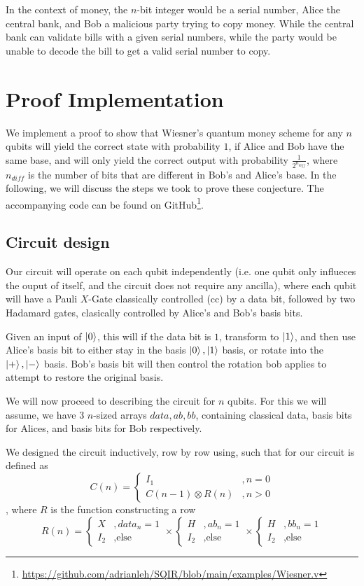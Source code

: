\documentclass{article}
\begin{document}
In the context of money, the $n$-bit integer would be a serial number, Alice the central bank, and Bob a malicious  party trying to copy money.
While the central bank can validate bills with a given serial numbers, while the  party would be unable to decode the bill to get a valid serial number to copy.

\section{Proof Implementation}\label{sec:proof-impl}
We implement a proof to show that Wiesner's quantum money scheme for any $n$ qubits will yield the correct state with probability $1$, if Alice and Bob have the same base, and will only yield the correct output with probability $\frac{1}{2^{n_{diff}}}$, where $n_{diff}$ is the number of bits that are different in Bob's and Alice's base. In the following, we will discuss the steps we took to prove these conjecture. The accompanying code can be found on GitHub\footnote{\url{https://github.com/adrianleh/SQIR/blob/main/examples/Wiesner.v}}.

\subsection{Circuit design}

Our circuit will operate on each qubit independently (i.e. one qubit only influeces the ouput of itself, and the circuit does not require any ancilla), where each qubit will have a Pauli $X$-Gate classically controlled (cc) by a data bit, followed by two Hadamard gates, clasically controlled by Alice's and Bob's basis bits.

Given an input of $\ket{0}$, this will if the data bit is $1$, transform to $\ket{1}$, and then use Alice's basis bit to either stay in the basis $\ket{0},\ket{1}$ basis, or rotate into the $\ket{+},\ket{-}$ basis. 
Bob's basis bit will then control the rotation bob applies to attempt to restore the original basis.

We will now proceed to describing the circuit for $n$ qubits. 
For this we will assume, we have $3$ $n$-sized arrays $data, ab, bb$, containing classical data, basis bits for Alices, and basis bits for Bob respectively.

We designed the circuit inductively, row by row using, such that for our circuit is defined as
$$C(n) = \begin{cases}
I_1&, n=0\\
C(n-1) \otimes R(n)&, n>0
\end{cases}$$,
where $R$ is the function constructing a row
$$R(n) = \begin{cases}X&, data_n = 1\\ I_2&, \text{else}\end{cases} \times \begin{cases}H&, ab_n = 1\\ I_2&, \text{else}\end{cases} \times \begin{cases}H&, bb_n = 1\\ I_2&, \text{else}\end{cases}$$
\end{document}
